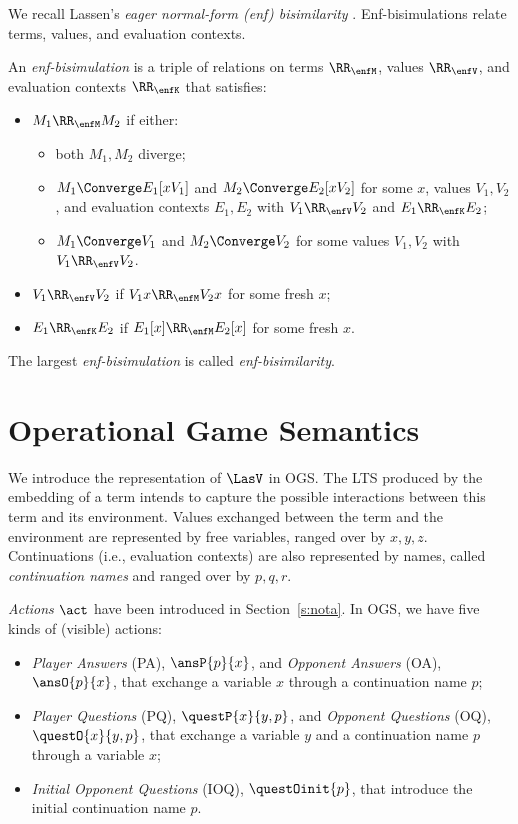  We recall  Lassen's 
\emph{eager normal-form (enf) bisimilarity} \cite{lassentrees}.
Enf-bisimulations relate terms, values, and evaluation contexts.

\begin{definition}
\label{d:enf}
 An \emph{enf-bisimulation} is a triple of relations on terms $\RR_{\enfM}$,
 values $\RR_{\enfV}$, and evaluation contexts $\RR_{\enfK}$ that satisfies:
 
 \begin{itemize}
  \item $M_1 \RR_{\enfM} M_2$ if either:
  \begin{itemize}
   \item both $M_1,M_2$ diverge;
   \item $M_1 \Converge E_1[x V_1]$ and $M_2 \Converge E_2[x V_2]$
   for some $x$, values $V_1,V_2$, and evaluation contexts $E_1,E_2$ with
   $V_1 \RR_{\enfV} V_2$ and $E_1 \RR_{\enfK} E_2$;
   \item $M_1 \Converge V_1$ and $M_2 \Converge V_2$ for some values $V_1,V_2$
   with $V_1 \RR_{\enfV} V_2$.
  \end{itemize}
  \item $V_1 \RR_{\enfV} V_2$ if $V_1 x \RR_{\enfM} V_2 x$ for some fresh $x$;
  \item $E_1 \RR_{\enfK} E_2$ if $E_1[x] \RR_{\enfM} E_2[x]$ for some fresh $x$.
 \end{itemize}
 \noindent
 The largest \emph{enf-bisimulation} is called \emph{enf-bisimilarity}.
\end{definition} 
\section{Operational Game Semantics}
\label{s:AOGS}
 
We introduce the representation of $\LasV$ in OGS. 
The LTS produced by the embedding of a term intends to capture the possible interactions 
between this term and its environment.
Values exchanged between the term and the environment are represented by free variables, 
ranged over by $x,y,z$. 
Continuations (i.e., evaluation contexts) are also
represented by names, called \emph{continuation names} and ranged over by  $p,q,r$.

\emph{Actions} $\act$ have been introduced in Section~\ref{s:nota}. 
In OGS, we have five kinds of (visible) actions:
\begin{itemize}
  \item \emph{Player Answers} (PA), $\ansP{p}{x}$,
  and \emph{Opponent Answers} (OA),  $\ansO{p}{x}$,
  that exchange a variable $x$ through a continuation name $p$;
  \item \emph{Player Questions} (PQ), $\questP{x}{y,p}$,
  and \emph{Opponent Questions} (OQ), $\questO{x}{y,p}$, 
  that exchange a variable $y$ and a continuation name $p$ through a variable $x$;
  \item \emph{Initial Opponent Questions} (IOQ), $\questOinit{p}$, that
  introduce the initial continuation name $p$.
\end{itemize}
 
